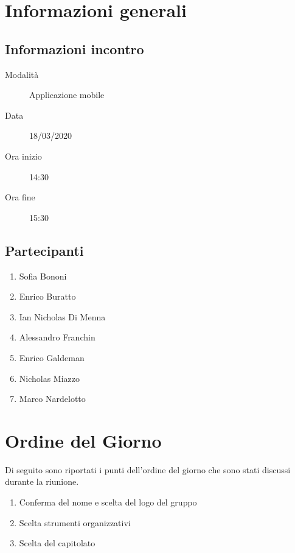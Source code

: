 \documentclass{article}
\begin{document}


\section{Informazioni generali}%
\label{sec:informazioni_generali}

\subsection{Informazioni incontro}%
\label{sub:informazioni_incontro}

\begin{description}
  \item[Modalità] Applicazione mobile 
  \item[Data] 18/03/2020
  \item[Ora inizio] 14:30
  \item[Ora fine] 15:30
\end{description}

\subsection{Partecipanti}%
\label{sub:partecipanti}

\begin{enumerate}
  \item Sofia Bononi
  \item Enrico Buratto
  \item Ian Nicholas Di Menna
  \item Alessandro Franchin
  \item Enrico Galdeman
  \item Nicholas Miazzo
  \item Marco Nardelotto
\end{enumerate}

\section{Ordine del Giorno}%
\label{ordine_del_giorno}
Di seguito sono riportati i punti dell'ordine del giorno che sono stati discussi durante la riunione.
\begin{enumerate}
  \item Conferma del nome e scelta del logo del gruppo
  \item Scelta strumenti organizzativi
  \item Scelta del capitolato
\end{enumerate}
\end{document}
